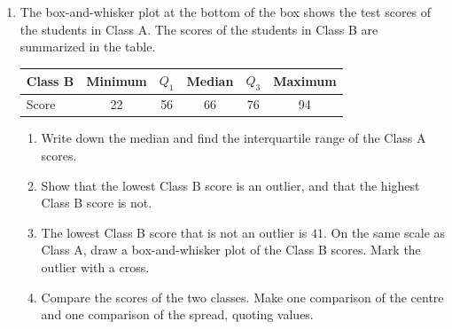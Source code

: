 \documentclass[12pt, twoside]{article}
\begin{document}
\begin{enumerate}[itemsep=0.15cm]
\newpage

\item[2.]

The box-and-whisker plot at the bottom of the box shows the test scores of
the students in Class A. The scores of the students in Class B are
summarized in the table.

\begin{center}
\setlength{\tabcolsep}{10pt}\renewcommand{\arraystretch}{1.2}
\begin{tabular}{|l|c|c|c|c|c|}
\hline
Class B & Minimum & $Q_{1}$ & Median & $Q_{3}$ & Maximum \\
\hline
Score & 22 & 56 & 66 & 76 & 94 \\
\hline
\end{tabular}
\end{center}

\begin{enumerate}[itemsep=0.1cm]
  \item Write down the median and find the interquartile range of the
  Class A scores.
  \item Show that the lowest Class B score is an outlier, and that the
  highest Class B score is not.
  \item The lowest Class B score that is not an outlier is $41$. On the
  same scale as Class A, draw a box-and-whisker plot of the Class B
  scores. Mark the outlier with a cross.
  \item Compare the scores of the two classes. Make one comparison of
  the centre and one comparison of the spread, quoting values.
\end{enumerate}


\end{enumerate}
\end{document}
